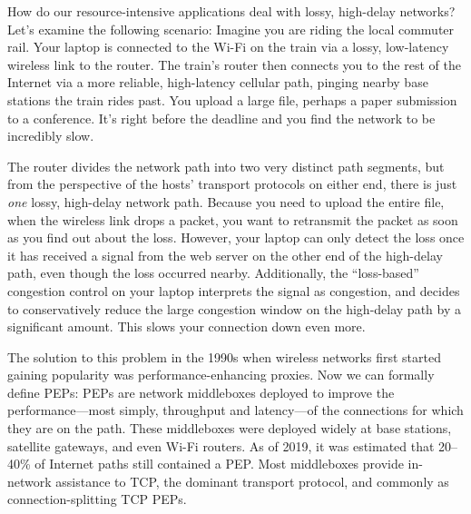 


How do our resource-intensive applications deal with lossy, high-delay networks?
Let's examine the following scenario: Imagine you are riding the local commuter
rail. Your laptop is connected to the Wi-Fi on the train via a lossy,
low-latency wireless link to the router. The train's router then connects you
to the rest of the Internet via a more reliable, high-latency cellular path,
pinging nearby base stations the train rides past. You upload a large file,
perhaps a paper submission to a conference. It's right before the deadline
and you find the network to be incredibly slow.

The router divides the network path into two very distinct path segments, but
from the perspective of the hosts' transport protocols on either end, there is
just \textit{one} lossy, high-delay network path. Because you need to upload
the entire file, when the wireless link drops a packet, you want to retransmit
the packet as soon as you find out about the loss. However, your laptop can
only detect the loss once it has received a signal from the web server on the
other end of the high-delay path, even though the loss occurred nearby.
Additionally, the ``loss-based'' congestion control on your laptop interprets
the signal as congestion, and decides to conservatively reduce the large
congestion window on the high-delay path by a significant amount. This slows
your connection down even more.

The solution to this problem in the 1990s when wireless networks first started
gaining popularity was performance-enhancing proxies. Now we can formally
define PEPs: PEPs are network middleboxes deployed to improve the
performance---most simply, throughput and latency---of the connections for
which they are on the path. These middleboxes were deployed widely at base
stations, satellite gateways, and even Wi-Fi routers. As of 2019, it was
estimated that 20--40\% of Internet paths still contained a PEP. Most
middleboxes provide in-network assistance to TCP, the dominant transport
protocol, and commonly as connection-splitting TCP PEPs.

